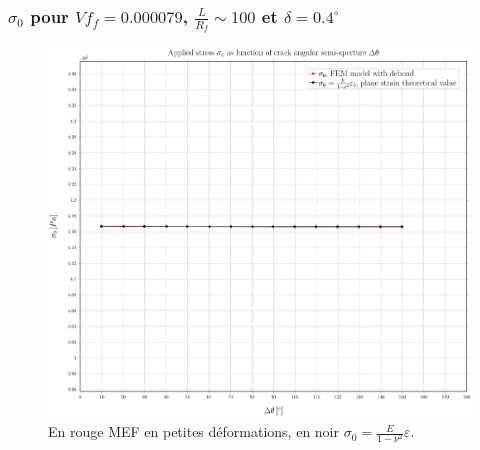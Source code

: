 \documentclass[first,firstsupp,lastsupp,handout,last,hyperref,table]{ETHclass}
\begin{document}
\begin{frame}
\frametitle{\small $\sigma_{0}$ pour $Vf_{f}=0.000079$, $\frac{L}{R_{f}}\sim100$ et $\delta=0.4^{\circ}$}
\vspace{-0.5cm}
\centering
\captionsetup[figure]{font=scriptsize,labelfont=scriptsize}
\begin{figure}[!h]
\centering
\includegraphics[height=0.7\textheight]{2017-06-16_AbqRunSummary_SingleFiberEqRfSmallStrain-D0-4_sigma-inf_Summary.pdf}
  \caption{\scriptsize En rouge MEF en petites d\'eformations, en noir $\sigma_{0}=\frac{E}{1-\nu^{2}}\varepsilon$.}
  \label{fig:res1}
\end{figure}
\end{frame}
\end{document}
